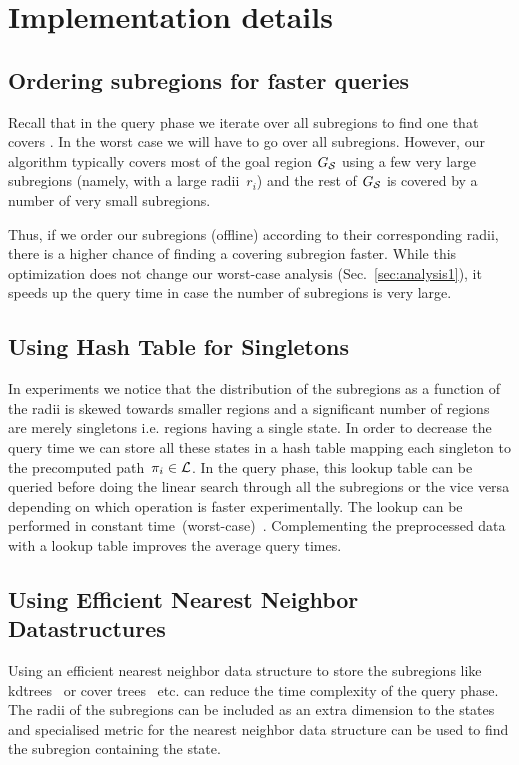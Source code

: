\documentclass[a4paper]{report}
\begin{document}
\section{Implementation details}
\label{subsec:impl}

\subsection{Ordering subregions for faster queries}
Recall that in the query phase we iterate over all subregions to find one that covers \sGoal. 
In the worst case we will have to go over all subregions.
However,  our algorithm typically covers most of the goal region $G_\mathcal{S}$ using a few very large subregions (namely, with a large radii~$r_i$) and the rest of $G_\mathcal{S}$ is covered by a number of very small subregions.

Thus, if we order our subregions (offline) according to their corresponding radii, there is a higher chance of finding a covering subregion faster. While this optimization does not change our worst-case analysis (Sec.~\ref{sec:analysis1}), it speeds up the query time in case the number of subregions is very large.

\subsection{Using Hash Table for Singletons}
In experiments we notice that the distribution of the subregions as a function of the radii is skewed towards smaller regions and a significant number of regions are merely singletons i.e. regions having a single state. In order to decrease the query time we can store all these states in a hash table mapping each singleton to the precomputed path~$\pi_i \in \mathcal{L}$.  In the query phase, this lookup table can be queried before doing the linear search through all the subregions or the vice versa depending on which operation is faster experimentally. The lookup can be performed in constant time~(worst-case)~\cite{czech1997perfect}. Complementing the preprocessed data with a lookup table improves the average query times.

\subsection{Using Efficient Nearest Neighbor Datastructures}
Using an efficient nearest neighbor data structure to store the subregions like kdtrees~\cite{bentley1975multidimensional} or cover trees~\cite{beygelzimer2006cover} etc. can reduce the time complexity of the query phase. The radii of the subregions can be included as an extra dimension to the states and specialised metric for the nearest neighbor data structure can be used to find the subregion containing the state.
\end{document}

